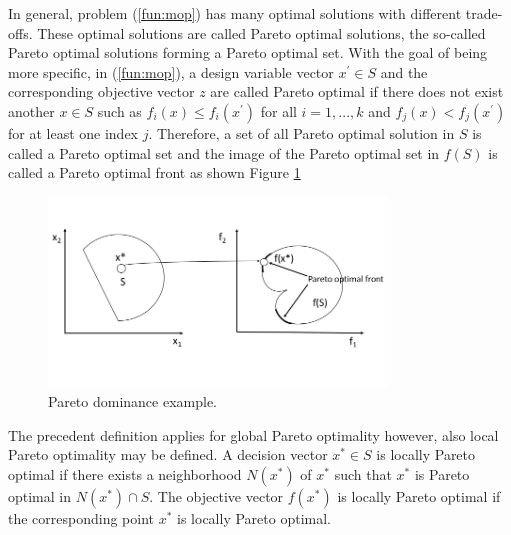 In general, problem (\ref{fun:mop}) has many optimal solutions with different trade-offs. These optimal solutions are called Pareto optimal solutions, the so-called Pareto optimal solutions forming a Pareto optimal set. With the goal of being more specific, in (\ref{fun:mop}), a design variable vector $ x^{'} \in S$ and the corresponding objective vector $z$
 are called Pareto optimal if there does not exist another $ x \in S$ such as $f_{i}(x) \leq f_{i}(x^{'})$ for all $i = 1,...,k$ and $f_{j}(x) < f_{j}(x^{'})$ for at least one index $j$.
Therefore, a set of all Pareto optimal solution in $S$ is called a Pareto optimal set and the image of the Pareto optimal set in $f(S)$ is called a Pareto optimal front as shown Figure \ref{fig:decisions_objective_space}
 \begin{figure}[H] %
	\centering 
	\includegraphics[width=0.80\textwidth]{figures/multiobjective/decision_objective_spaces.png}
	\caption{Pareto dominance example.} \label{fig:decisions_objective_space}
\end{figure} 
The precedent definition applies for global Pareto optimality however, also local Pareto optimality may be defined. A decision vector $x^{*} \in S$ is locally Pareto optimal if there exists a neighborhood $N(x^{*})$ of $x^{*}$ such that $x^{*}$ is Pareto optimal in $N(x^{*}) \cap S$. The objective vector $f(x^{*})$ is locally Pareto optimal if the corresponding point $x^{*}$ is locally Pareto optimal.
 
